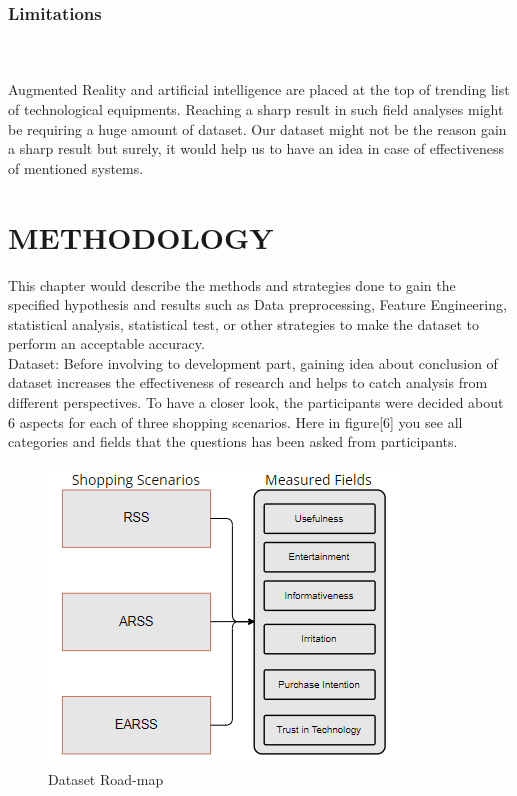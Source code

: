 \documentclass[letterpaper, 10 pt, conference]{ieeeconf}
\begin{document}
\subsubsection{Limitations}\hfill\\\hfill\\
Augmented Reality and artificial intelligence are placed at the top of trending list of technological equipments. Reaching a sharp result in such field analyses might be requiring a huge amount of dataset. Our dataset might not be the reason gain a sharp result but surely, it would help us to have an idea in case of effectiveness of mentioned systems.\\

\section{METHODOLOGY}
This chapter would describe the methods and strategies done to gain the specified hypothesis and results such as Data preprocessing, Feature Engineering, statistical analysis, statistical test, or other strategies to make the dataset to perform an acceptable accuracy. \\
Dataset: Before involving to development part, gaining idea about conclusion of dataset increases the effectiveness of research and helps to catch analysis from different perspectives. To have a closer look, the participants were decided about 6 aspects for each of three shopping scenarios. Here in figure[6] you see all categories and fields that the questions has been asked from participants.

\begin{figure}[!ht]
    \centering
    \includegraphics[scale = 0.6]{Picture6.png}
    \caption{Dataset Road-map}
    
\end{figure}
\end{document}
